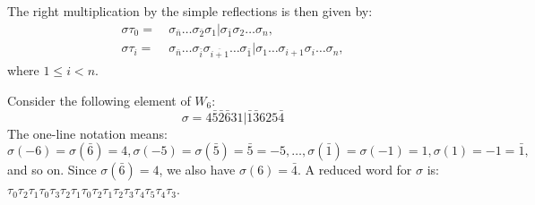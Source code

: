 \documentclass[ALCO,Unicode]{cedram}
\theoremstyle{definition}
\begin{document}
The right multiplication by the simple reflections is then given by:
\begin{align*}
\sigma\tau_0=&\  \sigma_{\bar n}\dots \sigma_{\bar 2}\sigma_{1}| \sigma_{\bar 1} \sigma_2\dots \sigma_n,\\
\sigma\tau_i=&\ \sigma_{\bar n}\dots\sigma_{\bar i} \sigma_{\overline{i+1}}\dots \sigma_{\bar 1}| \sigma_{1} \dots \sigma_{i+1}\sigma_i\dots \sigma_n,
\end{align*}
where  $1\leq i<n$. 

\begin{ex}\label{ex:TypeB1} Consider the following element of $W_6$:
$$
\sigma=4 \bar{5} \bar{2} \bar{6} 3 1 | \bar{1} \bar{3} 6 2 5 \bar{4}
$$
The one-line notation  means:
$$
\sigma (-6) = \sigma(\bar 6) = 4, \sigma(-5 )= \sigma(\bar 5) = \bar 5=-5, \dots,\sigma(\bar 1)= \sigma(-1) = 1, \sigma(1) = -1=\bar 1, 
$$ 
and so on. Since $ \sigma(\bar 6) = 4$, we also have $ \sigma(6) = \bar 4$.  A reduced word for $\sigma$ is: $\tau_0 \tau_2 \tau_1 \tau_0 \tau_3 \tau_2 \tau_1 \tau_0 \tau_2 \tau_1 \tau_2 \tau_3 \tau_4 \tau_5 \tau_4 \tau_3$.
\end{ex}
\end{document}
